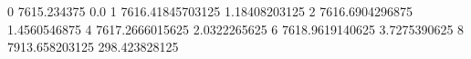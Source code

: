 0 7615.234375 0.0
1 7616.41845703125 1.18408203125
2 7616.6904296875 1.4560546875
4 7617.2666015625 2.0322265625
6 7618.9619140625 3.7275390625
8 7913.658203125 298.423828125
